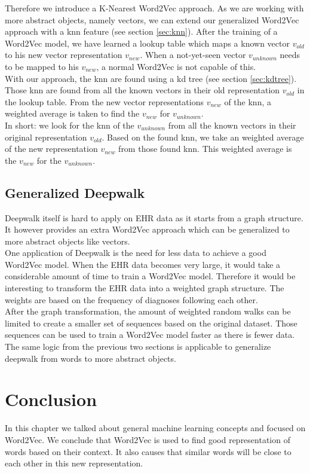 Therefore we introduce a K-Nearest Word2Vec approach. As we are working with more abstract objects, namely vectors, we can extend our generalized Word2Vec approach with a knn feature (see section \ref{sec:knn}). After the training of a Word2Vec model, we have learned a lookup table which maps a known vector $v_{old}$ to his new vector representation $v_{new}$. When a not-yet-seen vector $v_{unknown}$ needs to be mapped to his $v_{new}$, a normal Word2Vec is not capable of this. \\
With our approach, the knn are found using a kd tree (see section \ref{sec:kdtree}). Those knn are found from all the known vectors in their old representation $v_{old}$ in the lookup table. From the new vector representations $v_{new}$ of the knn, a weighted average is taken to find the $v_{new}$ for $v_{unknown}$. \\

In short: we look for the knn of the $v_{unknown}$ from all the known vectors in their original representation $v_{old}$. Based on the found knn, we take an weighted average of the new representation $v_{new}$ from those found knn. This weighted average is the $v_{new}$ for the $v_{unknown}$.

\subsection{Generalized Deepwalk}

Deepwalk itself is hard to apply on EHR data as it starts from a graph structure. It however provides an extra Word2Vec approach which can be generalized to more abstract objects like vectors. \\

One application of Deepwalk is the need for less data to achieve a good Word2Vec model. When the EHR data becomes very large, it would take a considerable amount of time to train a Word2Vec model. Therefore it would be interesting to transform the EHR data into a weighted graph structure. The weights are based on the frequency of diagnoses following each other. \\
After the graph transformation, the amount of weighted random walks can be limited to create a smaller set of sequences based on the original dataset. Those sequences can be used to train a Word2Vec model faster as there is fewer data. The same logic from the previous two sections is applicable to generalize deepwalk from words to more abstract objects.


\section{Conclusion}
In this chapter we talked about general machine learning concepts and focused on Word2Vec. We conclude that Word2Vec is used to find good representation of words based on their context. It also causes that similar words will be close to each other in this new representation. \\

